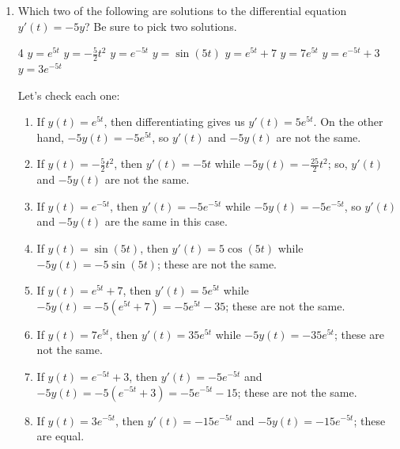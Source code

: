 \documentclass{article}
\begin{document}
\begin{enumerate}

\item 




  \begin{problem}
    Which two of the following are solutions to the differential equation
    $y'(t)=-5y$?  Be sure to pick two solutions.
  \end{problem}

  
    \begin{enumerate}[label=\protect\maybecircle{\Alph*.}]
    \begin{multicols}{4}
    \plainitem $y=e^{5t}$
    \plainitem $y= - \frac{5}{2} t^2$
    \circleitem $y=e^{-5t}$
    \plainitem $y=\sin(5t)$
    \plainitem $y=e^{5t} + 7$
    \plainitem  $y=7e^{5t} $
    \plainitem $y=e^{-5t} + 3$
    \circleitem $y=3e^{-5t} $
    \end{multicols}
    \end{enumerate}    
  

  \begin{solution}
    Let's check each one:
    \begin{enumerate}[label=\protect\maybecircle{\Alph*.}]      
    \item If $y(t) = e^{5t}$, then differentiating gives us $y'(t) = 5
      e^{5t}$.  On the other hand, $-5 y(t) = -5 e^{5t}$, so $y'(t)$ and
      $-5 y(t)$ are not the same.
    \item If $y(t) = - \frac{5}{2} t^2$, then $y'(t) = -5t$ while $- 5
      y(t) = -\frac{25}{2} t^2$; so, $y'(t)$ and $-5 y(t)$ are not the
      same.
    \item If $y(t) = e^{-5t}$, then $y'(t) = - 5 e^{-5t}$ while $-5 y(t) =
      - 5 e^{-5t}$, so $y'(t)$ and $-5 y(t)$ are the same in this case.
    \item If $y(t) = \sin(5t)$, then $y'(t) = 5 \cos(5t)$ while $-5 y(t) =
      -5 \sin(5t)$; these are not the same.
    \item If $y(t) = e^{5t} + 7$, then $y'(t) = 5 e^{5t}$ while $-5 y(t) = -5
      (e^{5t} + 7) = - 5 e^{5t} - 35$; these are not the same.
    \item If $y(t) = 7 e^{5t}$, then $y'(t) = 35 e^{5t}$ while $-5 y(t) =
      -35 e^{5t}$; these are not the same.
    \item If $y(t) = e^{-5t} + 3$, then $y'(t) = - 5 e^{-5t}$ and $-5 y(t)
      = -5 \left( e^{-5t} + 3 \right) = -5 e^{-5t} - 15$; these are not
      the same.
    \item If $y(t) = 3 e^{-5t}$, then $y'(t) = -15 e^{-5t}$ and $-5 y(t) =
      -15 e^{-5t}$; these are equal. 
    \end{enumerate}
  \end{solution}


\end{enumerate}
\end{document}
